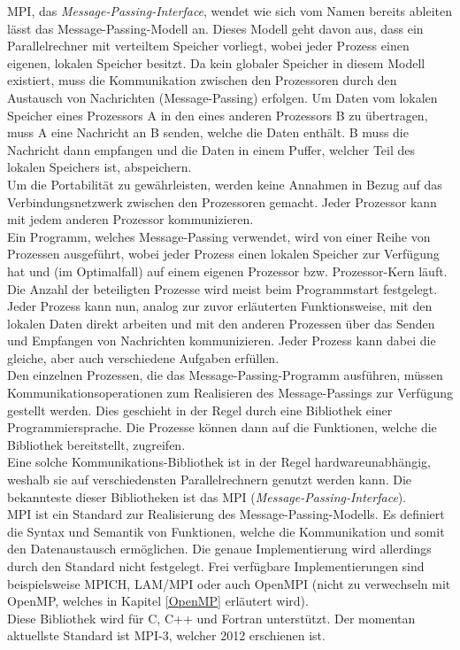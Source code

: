 			MPI, das \textit{Message-Passing-Interface}, wendet wie sich vom Namen bereits ableiten lässt das Message-Passing-Modell an. Dieses Modell geht davon aus, dass ein Parallelrechner mit verteiltem Speicher vorliegt, wobei jeder Prozess einen eigenen, lokalen Speicher besitzt. Da kein globaler Speicher in diesem Modell existiert, muss die Kommunikation zwischen den Prozessoren durch den Austausch von Nachrichten (Message-Passing) erfolgen. Um Daten vom lokalen Speicher eines Prozessors A in den eines anderen Prozessors B zu übertragen, muss A eine Nachricht an B senden, welche die Daten enthält. B muss die Nachricht dann empfangen und die Daten in einem Puffer, welcher Teil des lokalen Speichers ist, abspeichern.\\
			Um die Portabilität zu gewährleisten, werden keine Annahmen in Bezug auf das Verbindungsnetzwerk zwischen den Prozessoren gemacht. Jeder Prozessor kann mit jedem anderen Prozessor kommunizieren.\\
			Ein Programm, welches Message-Passing verwendet, wird von einer Reihe von Prozessen ausgeführt, wobei jeder Prozess einen lokalen Speicher zur Verfügung hat und (im Optimalfall) auf einem eigenen Prozessor bzw. Prozessor-Kern läuft. Die Anzahl der beteiligten Prozesse wird meist beim Programmstart festgelegt. Jeder Prozess kann nun, analog zur zuvor erläuterten Funktionsweise, mit den lokalen Daten direkt arbeiten und mit den anderen Prozessen über das Senden und Empfangen von Nachrichten kommunizieren. Jeder Prozess kann dabei die gleiche, aber auch verschiedene Aufgaben erfüllen.\\
			Den einzelnen Prozessen, die das Message-Passing-Programm ausführen, müssen Kommunikationsoperationen zum Realisieren des Message-Passings zur Verfügung gestellt werden. Dies geschieht in der Regel durch eine Bibliothek einer Programmiersprache. Die Prozesse können dann auf die Funktionen, welche die Bibliothek bereitstellt, zugreifen.\\
			Eine solche Kommunikations-Bibliothek ist in der Regel hardwareunabhängig, weshalb sie auf verschiedensten Parallelrechnern genutzt werden kann. Die bekannteste dieser Bibliotheken ist das MPI (\textit{Message-Passing-Interface}).\\
			MPI ist ein Standard zur Realisierung des Message-Passing-Modells. Es definiert die Syntax und Semantik von Funktionen, welche die Kommunikation und somit den Datenaustausch ermöglichen. Die genaue Implementierung wird allerdings durch den Standard nicht festgelegt. Frei verfügbare Implementierungen sind beispielsweise MPICH, LAM/MPI oder auch OpenMPI (nicht zu verwechseln mit OpenMP, welches in Kapitel \ref{OpenMP} erläutert wird).\\
			Diese Bibliothek wird für C, C++ und Fortran unterstützt. Der momentan aktuellste Standard ist MPI-3, welcher 2012 erschienen ist. \cite{ParaProgRauber}
			
